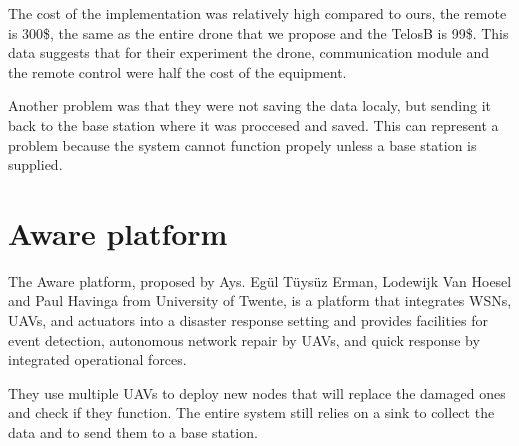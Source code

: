 The cost of the implementation was relatively high compared to ours, the remote is 300\$, the same as the entire drone that we propose and the TelosB is 99\$. This data suggests that for their experiment the drone, communication module and the remote control were half the cost of the equipment.

Another problem was that they were not saving the data localy, but sending it back to the base station where it was proccesed and saved. This can represent a problem because the system cannot function propely unless a base station is supplied.

\section{Aware platform}\cite{ollero2007aware}

The Aware platform, proposed by Ays. Egül Tüysüz Erman, Lodewijk Van Hoesel and Paul Havinga from University of Twente, is a platform that integrates WSNs, UAVs, and actuators into a disaster response setting and provides facilities for event detection, autonomous network repair by UAVs, and quick response by integrated operational forces.

They use multiple UAVs to deploy new nodes that will replace the damaged ones and check if they function. The entire system still relies on a sink to collect the data and to send them to a base station.\cite{erman2008enabling}
